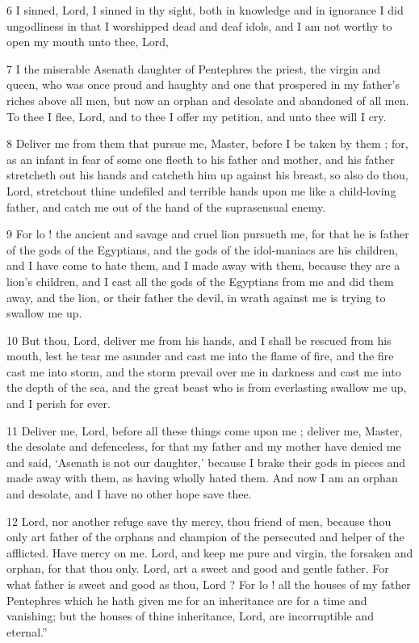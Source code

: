 6 I sinned, Lord, I sinned in thy sight, both in knowledge and in ignorance 
I did ungodliness in that I worshipped dead and deaf idols, 
and I am not worthy to open my mouth unto thee, Lord, 

7 I the miserable Asenath daughter of Pentephres the priest, the virgin and queen, 
who was once proud and haughty and one that prospered in my father's riches above all men, 
but now an orphan and desolate and abandoned of all men. 
To thee I flee, Lord, and to thee I offer my petition, 
and unto thee will I cry. 

8 Deliver me from them that pursue me, Master, before I be taken by them ; 
for, as an infant in fear of some one fleeth to his father and mother, 
and his father stretcheth out his hands and catcheth him up against his breast, 
so also do thou, Lord, stretchout thine undefiled and terrible hands upon me like a child-loving father, 
and catch me out of the hand of the suprasensual enemy. 

9 For lo ! the ancient and savage and cruel lion pursueth me, 
for that he is father of the gods of the Egyptians, 
and the gods of the idol-maniacs are his children, 
and I have come to hate them, and I made away with them, 
because they are a lion's children, 
and I cast all the gods of the Egyptians from me and did them away, 
and the lion, or their father the devil, in wrath against me is trying to swallow me up. 

10 But thou, Lord, deliver me from his hands, 
and I shall be rescued from his mouth, 
lest he tear me asunder and cast me into the flame of fire, 
and the fire cast me into storm, 
and the storm prevail over me in darkness and cast me into the depth of the sea, 
and the great beast who is from everlasting swallow me up, 
and I perish for ever. 

11 Deliver me, Lord, before all these things come upon me ; 
deliver me, Master, the desolate and defenceless, 
for that my father and my mother have denied me and said, 
‘Asenath is not our daughter,’ 
because I brake their gods in pieces and made away with them, 
as having wholly hated them. And now I am an orphan and desolate, and I have no other hope save thee. 

12 Lord, nor another refuge save thy mercy, thou friend of men, 
because thou only art father of the orphans and champion of the persecuted and helper of the afflicted. 
Have mercy on me. Lord, and keep me pure and virgin, 
the forsaken and orphan, for that thou only. 
Lord, art a sweet and good and gentle father. 
For what father is sweet and good as thou, Lord ? 
For lo ! all the houses of my father Pentephres 
which he hath given me for an inheritance are for a time and vanishing; 
but the houses of thine inheritance, Lord, are incorruptible and eternal.”

